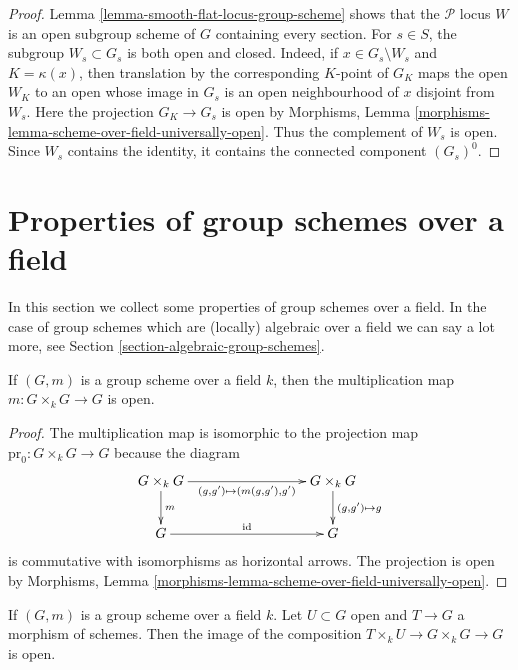 \begin{proof}
Lemma \ref{lemma-smooth-flat-locus-group-scheme} shows that the
$\mathcal{P}$ locus $W$ is an open subgroup scheme of $G$ containing
every section. For $s \in S$, the subgroup $W_s \subset G_s$ is both
open and closed. Indeed, if $x \in G_s \setminus W_s$ and
$K = \kappa(x)$, then translation by the corresponding $K$-point of
$G_K$ maps the open $W_K$ to an open whose image in $G_s$ is an open
neighbourhood of $x$ disjoint from $W_s$. Here the projection
$G_K \to G_s$ is open by Morphisms, Lemma
\ref{morphisms-lemma-scheme-over-field-universally-open}. Thus the
complement of $W_s$ is open. Since $W_s$ contains the identity, it
contains the connected component $(G_s)^0$.
\end{proof}





\section{Properties of group schemes over a field}
\label{section-properties-group-schemes-field}

\noindent
In this section we collect some properties of group schemes over a
field. In the case of group schemes which are (locally) algebraic
over a field we can say a lot more, see
Section \ref{section-algebraic-group-schemes}.

\begin{lemma}
\label{lemma-group-scheme-over-field-open-multiplication}
If $(G, m)$ is a group scheme over a field $k$, then the
multiplication map $m : G \times_k G \to G$ is open.
\end{lemma}

\begin{proof}
The multiplication map is isomorphic to the projection map
$\text{pr}_0 : G \times_k G \to G$
because the diagram
$$
\xymatrix{
G \times_k G \ar[d]^m \ar[rrr]_{(g, g') \mapsto (m(g, g'), g')} & & &
G \times_k G \ar[d]^{(g, g') \mapsto g} \\
G \ar[rrr]^{\text{id}} & & & G
}
$$
is commutative with isomorphisms as horizontal arrows. The projection
is open by
Morphisms, Lemma \ref{morphisms-lemma-scheme-over-field-universally-open}.
\end{proof}

\begin{lemma}
\label{lemma-group-scheme-over-field-translate-open}
If $(G, m)$ is a group scheme over a field $k$. Let $U \subset G$
open and $T \to G$ a morphism of schemes. Then the image of the
composition $T \times_k U \to G \times_k G \to G$ is open.
\end{lemma}

